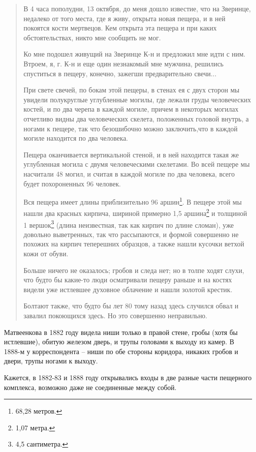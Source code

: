 \begin{quotation}
В 4 часа пополудни, 13 октября, до меня дошло известие, что на Зверинце, недалеко от того места, где я живу, открыта новая пещера, и в ней покоятся кости мертвецов. Кем открыта эта пещера и при каких обстоятельствах, никто мне сообщить не мог.

Ко мне подошел живущий на Зверинце К-н и предложил мне идти с ним. Втроем, я, г. К-н и еще один незнакомый мне мужчина, решились спуститься в пещеру, конечно, зажегши предварительно свечи...

При свете свечей, по бокам этой пещеры, в стенах ея с двух сторон мы увидели полукруглые углубленные могилы, где лежали груды человеческих костей, и по два черепа в каждой могиле, причем в некоторых могилах отчетливо видны два человеческих скелета, положенных головой внутрь, а ногами к пещере, так что безошибочно можно заключить,что в каждой могиле находится по два человека.

Пещера оканчивается вертикальной стеной, и в ней находится такая же углубленная могила с двумя человеческими скелетами. Во всей пещере мы насчитали 48 могил, и считая в каждой могиле по два человека, всего будет похороненных 96 человек.

Вся пещера имеет длины приблизительно 96 аршин\footnote{68,28 метров.}. В пещере этой мы нашли два красных кирпича, шириной примерно 1,5 аршина\footnote{1,07 метра.} и толщиной 1 вершок\footnote{4,5 сантиметра.} (длина неизвестная, так как кирпич по длине сломан), уже довольно выветренных, так что рассыпаются, и формой совершенно не похожих на кирпич теперешних образцов, а также нашли кусочки ветхой кожи от обуви.

Больше ничего не оказалось; гробов и следа нет; но в толпе ходят слухи, что будто бы какие-то люди осматривали пещеру раньше и на костях видели уже истлевшее духовное облачение и нашли золотой крестик. 

Болтают также, что будто бы лет 80 тому назад здесь случился обвал и завалил покоющихся здесь. Но это совершенно неправильно.
\end{quotation}

Матвеенкова в 1882 году видела ниши только в правой стене, гробы (хотя бы истлевшие), обитую железом дверь, и трупы головами к выходу из камер. В 1888-м у корреспондента – ниши по обе стороны коридора, никаких гробов и двери, трупы ногами к выходу.

Кажется, в 1882-83 и 1888 году открывались входы в две разные части пещерного комплекса, возможно даже не соединенные между собой.

